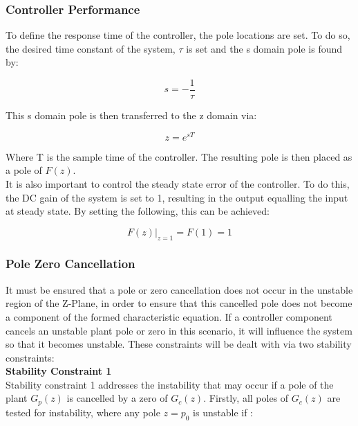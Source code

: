 \subsubsection{Controller Performance}

To define the response time of the controller, the pole locations are set. To do so, the desired time constant of the system, $\tau$ is set and the s domain pole is found by:

\begin{equation}
s = -\frac{1}{\tau}
\end{equation}

This s domain pole is then transferred to the z domain via:

\begin{equation}
z = e^{sT}
\end{equation}

Where T is the sample time of the controller. The resulting pole is then placed as a pole of $F(z)$.\\

It is also important to control the steady state error of the controller. To do this, the DC gain of the system is set to 1, resulting in the output equalling the input at steady state. By setting the following, this can be achieved:

\begin{equation}
F(z)|_{z=1} = F(1) = 1
\end{equation}

\subsubsection{Pole Zero Cancellation}

It must be ensured that a pole or zero cancellation does not occur in the unstable region of the Z-Plane, in order to ensure that this cancelled pole does not become a component of the formed characteristic equation. If a controller component cancels an unstable plant pole or zero in this scenario, it will influence the system so that it becomes unstable. These constraints will be dealt with via two stability constraints:\\

\textbf{Stability Constraint 1}\\
Stability constraint 1 addresses the instability that may occur if a pole of the plant $G_p(z)$ is cancelled by a zero of $G_c(z)$. Firstly, all poles of $G_c(z)$ are tested for instability, where any pole $z = p_0$ is unstable if :

